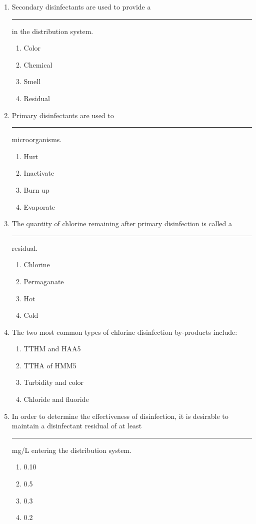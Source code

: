\documentclass{article}
\begin{document}
\begin{enumerate}
\item Secondary disinfectants are used to provide a \rule{2cm}{0.3pt} in the distribution
system.
\begin{enumerate}
\item Color
\item Chemical
\item Smell
\item Residual
\end{enumerate}

\item Primary disinfectants are used to \rule{2cm}{0.3pt}microorganisms.
\begin{enumerate}
\item Hurt
\item Inactivate
\item Burn up
\item Evaporate
\end{enumerate}

\item The quantity of chlorine remaining after primary disinfection is called a \rule{2cm}{0.3pt} residual.
\begin{enumerate}
\item Chlorine
\item Permaganate
\item Hot
\item Cold
\end{enumerate}

\item The two most common types of chlorine disinfection by-products include:
\begin{enumerate}
\item TTHM and HAA5
\item TTHA of HMM5
\item Turbidity and color
\item Chloride and fluoride
\end{enumerate}

\item In order to determine the effectiveness of disinfection, it is desirable to maintain a disinfectant residual of at least \rule{1cm}{0.5pt}  mg/L entering the distribution system.
\begin{enumerate}
\item 0.10
\item 0.5
\item 0.3
\item 0.2
\end{enumerate}


\end{enumerate}
\end{document}
